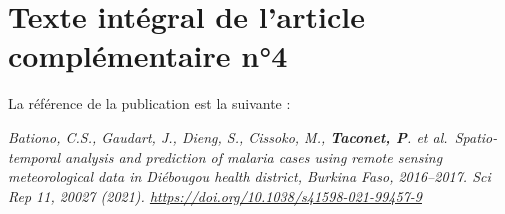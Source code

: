 \documentclass[12pt,twoside]{reedthesis}
\begin{document}
\markboth{}{}


\endgroup

\hypertarget{full-article-bationo}{%
\chapter{Texte intégral de l'article complémentaire n°4}\label{full-article-bationo}}
\begin{lightgreenbox}
\begin{center}
La référence de la publication est la suivante :

\end{center}
\emph{Bationo, C.S., Gaudart, J., Dieng, S., Cissoko, M., \textbf{Taconet, P}. et al.~Spatio-temporal analysis and prediction of malaria cases using remote sensing meteorological data in Diébougou health district, Burkina Faso, 2016--2017. Sci Rep 11, 20027 (2021). \url{https://doi.org/10.1038/s41598-021-99457-9}}

\end{lightgreenbox}
\begingroup 
\renewcommand{\headrulewidth}{0pt}

\markboth{}{}


\endgroup

\backmatter

\hypertarget{section}{%
\chapter*{}\label{section}}


\noindent

\setlength{\parindent}{-0.20in}


\end{document}
